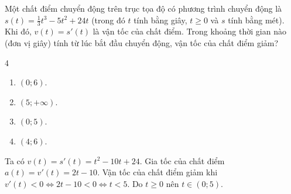 \begin{baitap}
	Một chất điểm chuyển động trên trục tọa độ có phương trình chuyển động là $s(t) = \frac{1}{3}t^3 - 5t^2 + 24t$ (trong đó $t$ tính bằng giây, $t \ge 0$ và $s$ tính bằng mét). Khi đó, $v(t) = s'(t)$ là vận tốc của chất điểm. Trong khoảng thời gian nào (đơn vị giây) tính từ lúc bắt đầu chuyển động, vận tốc của chất điểm giảm?
	\begin{multicols}{4}
		\begin{enumerate}
			\item $(0; 6)$.
			\item $(5; +\infty)$.
			\item $(0; 5)$.
			\item $(4; 6)$.
		\end{enumerate}
	\end{multicols}
	\begin{traloi}
		Ta có $v(t) = s'(t) = t^2 - 10t + 24$.
		Gia tốc của chất điểm $a(t) = v'(t) = 2t - 10$.
		Vận tốc của chất điểm giảm khi $v'(t) < 0 \Leftrightarrow 2t - 10 < 0 \Leftrightarrow t < 5$.
		Do $t \ge 0$ nên $t \in (0; 5)$.
	\end{traloi}
\end{baitap}

